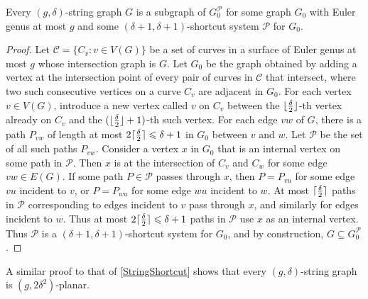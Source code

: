 \documentclass{patmorin}
\DeclarePairedDelimiter{\ceil}{\lceil}{\rceil}
\DeclarePairedDelimiter{\floor}{\lfloor}{\rfloor}
\newcommand{\PP}{\mathcal{P}}
\renewcommand{\leq}{\leqslant}
\begin{document}

\begin{lem}
\label{StringShortcut}
Every $(g,\delta)$-string graph $G$ is a subgraph of $G_0^\PP$ for some graph $G_0$ with Euler genus at most $g$ and some $(\delta+1,\delta+1 )$-shortcut system $\PP$ for $G_0$. 
\end{lem}

\begin{proof}
Let $\mathcal{C}=\{C_v:v\in V(G)\}$ be a set of curves in a surface of Euler genus at most $g$ whose intersection graph is $G$.  Let $G_0$ be the graph obtained by adding a vertex at the intersection point of every pair of curves in $\mathcal{C}$ that intersect,  where two such consecutive vertices on a curve $C_v$ are adjacent in $G_0$. For each vertex $v\in V(G)$, introduce a new vertex called $v$ on $C_v$ between the 
$\floor{\frac{\delta}{2}}$-th vertex already on $C_v$ and the $(\floor{\frac{\delta}{2}}+1)$-th such vertex. For each edge $vw$ of $G$, there is a path $P_{vw}$ of length at most $2\ceil{\frac{\delta}{2}}\leq \delta+1$ in $G_0$ between $v$ and $w$. Let $\PP$ be the set of all such paths $P_{vw}$. Consider a vertex $x$ in $G_0$ that is an internal vertex on some path in $\PP$. Then $x$ is at the intersection of $C_v$ and $C_w$ for some edge $vw\in E(G)$. If some path $P\in \PP$ passes through $x$, then $P=P_{vu}$ for some edge $vu$ incident to $v$, or $P=P_{wu}$ for some edge $wu$ incident to $w$. At most $\ceil{\frac{\delta}{2}}$ paths in $\PP$ corresponding to edges incident to $v$ pass through $x$, and similarly for edges incident to $w$. Thus at most $2\ceil{\frac{\delta}{2}}\leq\delta+1$ paths in $\PP$ use $x$ as an internal vertex. Thus $\PP$ is a $(\delta+1,\delta+1)$-shortcut system for $G_0$, and by construction, $G \subseteq G_0^\PP$. 
\end{proof}

A similar proof to that of \cref{StringShortcut} shows that every $(g,\delta)$-string graph is $(g,2\delta^2)$-planar. 
\end{document}
